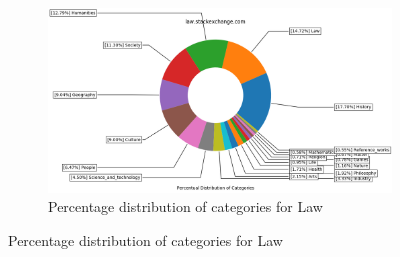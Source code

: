 \begin{figure}[H]
     \par\bigskip %
    \par\bigskip %
    \begin{subfigure}{0.9\textwidth}
    \centering
        \includegraphics[width=1\linewidth]{imgs/percentual-distribution/law_stackexchange_com_donut}
        \caption{Percentage distribution of categories for Law}
        \label{fig:percentage-distribution-law}
    \end{subfigure} 
 \end{figure}
 
